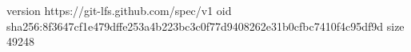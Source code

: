 version https://git-lfs.github.com/spec/v1
oid sha256:8f3647cf1e479dffe253a4b223bc3c0f77d9408262e31b0cfbc7410f4c95df9d
size 49248
